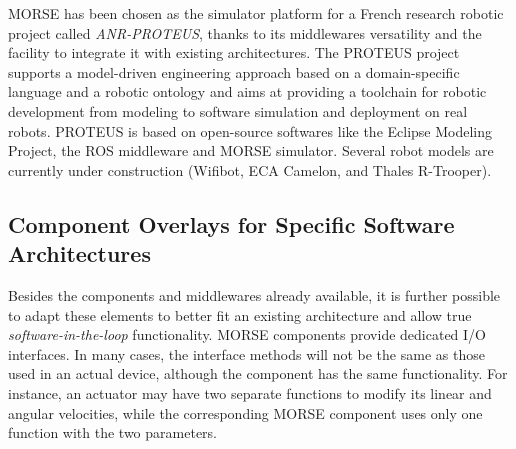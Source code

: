 \documentclass{llncs}
\newcommand{\serge}[1]{\nb{Serge}{blue}{#1}}
\newcommand{\gilberto}[1]{\nb{Gilberto}{red}{#1}}
\begin{document}
MORSE has been chosen as the simulator platform for a French research
robotic project called \emph{ANR-PROTEUS}, thanks to
its middlewares versatility and the facility to integrate it with
existing architectures.
The PROTEUS project supports a model-driven engineering approach based on a
domain-specific language and a robotic ontology\cite{Dhouib:2011zr} and aims at
providing a toolchain for robotic development from modeling to software
simulation and deployment on real robots. PROTEUS is based on open-source
softwares like the Eclipse Modeling Project, the ROS middleware and MORSE
simulator. Several robot models are currently under construction (Wifibot,
ECA Camelon, and Thales R-Trooper).

\subsection{Component Overlays for Specific Software Architectures}
\label{section:overlays}


Besides the components and middlewares already available, it is
further possible to adapt these elements to better fit an existing
architecture and allow true \emph{software-in-the-loop} functionality.
MORSE components provide dedicated I/O interfaces. In
many cases, the interface methods will not be the same as those used in an
actual device, although the component has the same functionality.
For instance, an actuator may have two separate functions to modify its linear
and angular velocities, while the corresponding MORSE component uses only one
function with the two parameters.
\end{document}
